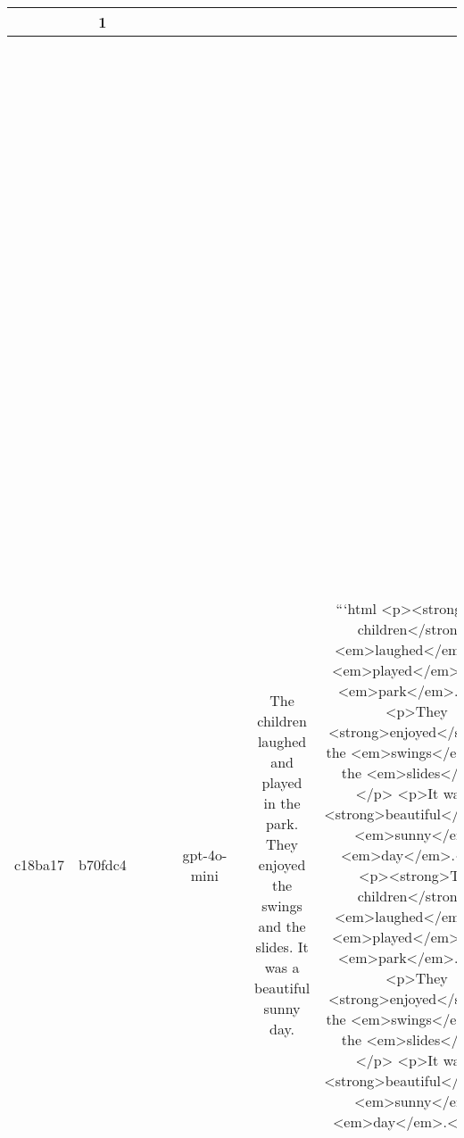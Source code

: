 \begin{table}[h!]
\begin{tabular}{|c|c|c|c|c|c|c|c|c|c|}
{{Given these points, the output does not follow the guideline for including both a `<strong>` and multiple `<em>` tags within each `<p>` tag.

ERR & 1\\
\hline
c18ba17 & b70fdc4 &  &  & gpt-4o-mini & The children laughed and played in the park. They enjoyed the swings and the slides. It was a beautiful sunny day. & ```html
<p><strong>The children</strong> <em>laughed</em> and <em>played</em> in the <em>park</em>.</p>
<p>They <strong>enjoyed</strong> the <em>swings</em> and the <em>slides</em>.</p>
<p>It was a <strong>beautiful</strong> <em>sunny</em> <em>day</em>.</p>
<p><strong>The children</strong> <em>laughed</em> and <em>played</em> in the <em>park</em>.</p>
<p>They <strong>enjoyed</strong> the <em>swings</em> and the <em>slides</em>.</p>
<p>It was a <strong>beautiful</strong> <em>sunny</em> <em>day</em>.</p>
``` & ok & The chatbot's output consists of HTML where each sentence is wrapped in a `<p>` tag, with a `<strong>` tag and multiple `<em>` tags inside each `<p>` to highlight key words and phrases. The output contains six `<p>` tags, which complies with the rule that there should be at least three `<p>` tags.

Each `<p>` tag contains at least one `<strong>` tag and multiple `<em>` tags, which is in accordance with the description instructions. Given that the number of tags and their usage meet the criterion outlined in the description, this output complies with the chatbot's instructions.

All these details align with the direct and explicit requirements provided in the description. Hence, based on the available output, the requirements are satisfied without any violations.

No violation.
OK & 1\\
\hline
c18ba17 & b70fdc4 &  &  & gemma2:9b & The children laughed and played in the park. They enjoyed the swings and the slides. It was a beautiful sunny day. & Here's the formatted HTML paragraph:

<p><strong>The</strong> <em>children</em> laughed and played in the <strong>park</strong>.</p>
<p>They enjoyed the <em>swings</em> and the <em>slides</em>.</p>
<p>It was a <em>beautiful</em> <em>sunny</em> day.</p> 


Let me know if you'd like to experiment with other formatting options! & ok & The chatbot's output complies with the description in several key aspects:

1. The paragraph has been split into individual sentences, each wrapped in a `<p>` tag. There are three `<p>` tags present, which meets the requirement of having at least three `<p>` tags.

}}
\end{tabular}
\end{table}
